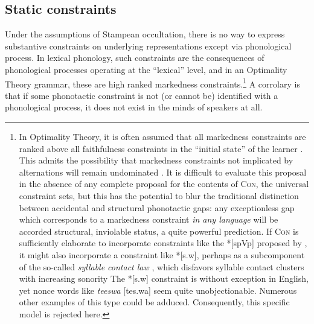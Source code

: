 \subsection{Static constraints}

Under the assumptions of Stampean occultation, there is no way to express substantive constraints on underlying representations except via phonological process.
In lexical phonology, such constraints are the consequences of phonological processes operating at the ``lexical'' level, and in an Optimality Theory grammar, these are high ranked markedness constraints.\footnote{In Optimality Theory, it is often assumed that all markedness constraints are ranked above all faithfulness constraints in the ``initial state'' of the learner \citep[e.g.,][]{Smolensky1996a}.
    This admits the possibility that markedness constraints not implicated by alternations will remain undominated \citep[e.g.,][]{Coetzee2008b}.
    It is difficult to evaluate this proposal in the absence of any complete proposal for the contents of \textsc{Con}, the universal constraint sets, but this has the potential to blur the traditional distinction between accidental and structural phonotactic gaps: any exceptionless gap which corresponds to a markedness constraint \emph{in any language} will be accorded structural, inviolable status, a quite powerful prediction.
    If \textsc{Con} is sufficiently elaborate to incorporate constraints like the *[spVp] proposed by \citet{Coetzee2008b}, it might also incorporate a constraint like *[s.w], perhaps as a subcomponent of the so-called \emph{syllable contact law} \citep[e.g.,][]{Gouskova2004,Murray1983}, which disfavors syllable contact clusters with increasing sonority 
    The *[s.w] constraint is without exception in English, yet nonce words like \emph{teeswa} [tes.wa] seem quite unobjectionable.
    Numerous other examples of this type could be adduced.
    Consequently, this specific model is rejected here.}
A corrolary is that if some phonotactic constraint is not (or cannot be) identified with a phonological process, it does not exist in the minds of speakers at all.

